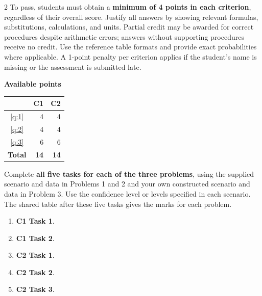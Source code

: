 \begin{multicols}{2}
\raggedcolumns
\setlength{\parskip}{3pt}
To pass, students must obtain a \textbf{minimum of 4 points in each criterion}, regardless of their overall score. Justify all answers by showing relevant formulas, substitutions, calculations, and units. Partial credit may be awarded for correct procedures despite arithmetic errors; answers without supporting procedures receive no credit. Use the reference table formats and provide exact probabilities where applicable. A 1-point penalty per criterion applies if the student's name is missing or the assessment is submitted late.

\noindent\begin{minipage}{\linewidth}
\centering\small
\textbf{Available points}\par\smallskip
\begin{tabular}{|c|r|r|}
	\hline
	\textbf{\textnumero}&\textbf{C1}&\textbf{C2}\\\hline
	\ref*{q:1}&4&4\\\hline
	\ref*{q:2}&4&4\\\hline
	\ref*{q:3}&6&6\\\hline
	\textbf{Total}&\textbf{14}&\textbf{14}\\\hline
\end{tabular}
\end{minipage}\par
{}
Complete \textbf{all five tasks for each of the three problems}, using the supplied scenario and data in Problems 1 and 2 and your own constructed scenario and data in Problem 3. Use the confidence level or levels specified in each scenario. The shared table after these five tasks gives the marks for each problem.
\begin{enumerate}[label=(\alph*),itemsep=1pt]
\item \textbf{C1 Task 1}. \cOneA
\columnbreak
\item \textbf{C1 Task 2}. \cOneB
\item \textbf{C2 Task 1}. \cTwoA
\item \textbf{C2 Task 2}. \cTwoB
\item \textbf{C2 Task 3}. \cTwoC
\end{enumerate}



\end{multicols}
